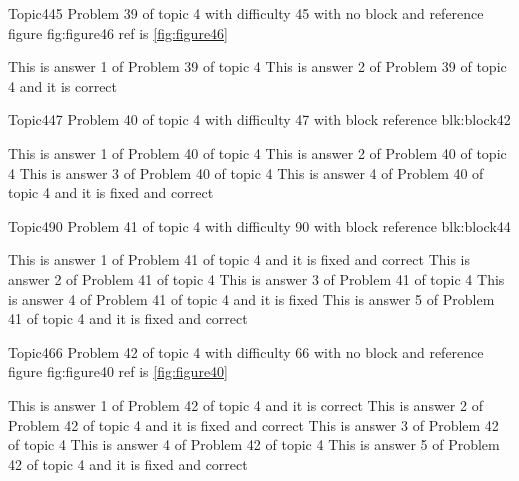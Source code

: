 \documentclass[master]{exam}
\begin{document}
\begin{problem}{Topic4}{45}
	Problem 39 of topic 4 with difficulty 45 with no block and reference figure fig:figure46 ref is \ref{fig:figure46}
	\begin{answers}
		\answer This is answer 1 of Problem 39 of topic 4 
		\answer[correct] This is answer 2 of Problem 39 of topic 4 and it is correct
	\end{answers}
\end{problem}

\begin{problem}[requires=blk:block42]{Topic4}{47}
	Problem 40 of topic 4 with difficulty 47 with block reference blk:block42
	\begin{answers}
		\answer This is answer 1 of Problem 40 of topic 4 
		\answer This is answer 2 of Problem 40 of topic 4 
		\answer This is answer 3 of Problem 40 of topic 4 
		 This is answer 4 of Problem 40 of topic 4 and it is fixed and correct
	\end{answers}
\end{problem}

\begin{problem}[requires=blk:block44]{Topic4}{90}
	Problem 41 of topic 4 with difficulty 90 with block reference blk:block44
	\begin{answers}
		 This is answer 1 of Problem 41 of topic 4 and it is fixed and correct
		\answer This is answer 2 of Problem 41 of topic 4 
		\answer This is answer 3 of Problem 41 of topic 4 
		\answer[fixed] This is answer 4 of Problem 41 of topic 4 and it is fixed
		 This is answer 5 of Problem 41 of topic 4 and it is fixed and correct
	\end{answers}
\end{problem}

\begin{problem}{Topic4}{66}
	Problem 42 of topic 4 with difficulty 66 with no block and reference figure fig:figure40 ref is \ref{fig:figure40}
	\begin{answers}
		\answer[correct] This is answer 1 of Problem 42 of topic 4 and it is correct
		 This is answer 2 of Problem 42 of topic 4 and it is fixed and correct
		\answer This is answer 3 of Problem 42 of topic 4 
		\answer This is answer 4 of Problem 42 of topic 4 
		 This is answer 5 of Problem 42 of topic 4 and it is fixed and correct
	\end{answers}
\end{problem}
\end{document}

